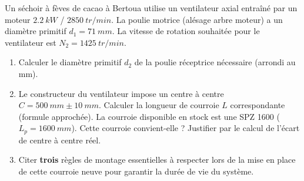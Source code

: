 \documentclass[11pt]{article}
\begin{document}
\begin{exercice}
Un séchoir à fèves de cacao à Bertoua utilise un ventilateur axial entraîné par un moteur $\SI{2,2}{kW}$ / $\SI{2850}{tr/min}$. La poulie motrice (alésage arbre moteur) a un diamètre primitif $d_1 = \SI{71}{mm}$. La vitesse de rotation souhaitée pour le ventilateur est $N_2 = \SI{1425}{tr/min}$.
\begin{enumerate}
    \item Calculer le diamètre primitif $d_2$ de la poulie réceptrice nécessaire (arrondi au mm).
    \item Le constructeur du ventilateur impose un centre à centre $C = \SI{500}{mm} \pm \SI{10}{mm}$. Calculer la longueur de courroie $L$ correspondante (formule approchée). La courroie disponible en stock est une SPZ 1600 ($L_p = \SI{1600}{mm}$). Cette courroie convient-elle ? Justifier par le calcul de l'écart de centre à centre réel.
    \item Citer \textbf{trois} règles de montage essentielles à respecter lors de la mise en place de cette courroie neuve pour garantir la durée de vie du système.
\end{enumerate}
\end{exercice}
\end{document}
